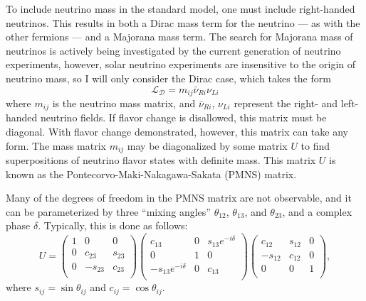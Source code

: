 To include neutrino mass in the standard model, one must include right-handed neutrinos.
This results in both a Dirac mass term for the neutrino --- as with the other fermions --- and a Majorana mass term.
The search for Majorana mass of neutrinos is actively being investigated by the current generation of neutrino experiments, however, solar neutrino experiments are insensitive to the origin of neutrino mass, so I will only consider the Dirac case, which takes the form
\begin{equation}
\mathscr{L_D} = m_{ij} \bar{\nu}_{Ri} \nu_{Li} 
\end{equation}
where $m_{ij}$ is the neutrino mass matrix, and $\bar{\nu}_{Ri}$, $\nu_{Li}$ represent the right- and left-handed neutrino fields.
If flavor change is disallowed, this matrix must be diagonal.
With flavor change demonstrated, however, this matrix can take any form.
The mass matrix $m_{ij}$ may be diagonalized by some matrix $U$ to find superpositions of neutrino flavor states with definite mass.
This matrix $U$ is known as the Pontecorvo-Maki-Nakagawa-Sakata (PMNS) matrix.

Many of the degrees of freedom in the PMNS matrix are not observable, and it can be parameterized by three ``mixing angles'' $\theta_{12}$, $\theta_{13}$, and $\theta_{23}$, and a complex phase $\delta$.
Typically, this is done as follows:
\begin{equation}
U = 
\left(
\begin{array}{ccc}
1 & 0        & 0\\
0 & c_{23}   & s_{23}\\
0 & -s_{23}  & c_{23}\\
\end{array}
\right)
\left(
\begin{array}{ccc}
c_{13}              & 0  & s_{13}e^{-i\delta} \\
0                   & 1  & 0                  \\
-s_{13}e^{-i\delta} & 0  & c_{13}             \\
\end{array}
\right)
\left(
\begin{array}{ccc}
c_{12}  & s_{12} & 0 \\
-s_{12} & c_{12} & 0 \\
0       & 0      & 1 \\
\end{array}
\right),
\end{equation}
where $s_{ij} = \sin{\theta_{ij}}$ and $c_{ij} = \cos{\theta_{ij}}$.


